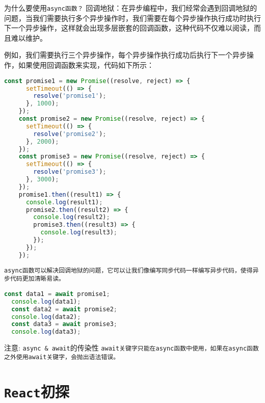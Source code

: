 \documentclass{beamer}
\begin{document}
\begin{frame}
  \framebreak

  \begin{block}{为什么要使用\tt{async}函数？}
    回调地狱：在异步编程中，我们经常会遇到回调地狱的问题，当我们需要执行多个异步操作时，我们需要在每个异步操作执行成功时执行下一个异步操作，这样就会出现多层嵌套的回调函数，这种代码不仅难以阅读，而且难以维护。

    例如，我们需要执行三个异步操作，每个异步操作执行成功后执行下一个异步操作，如果使用回调函数来实现，代码如下所示：
  \end{block}
  \begin{lstlisting}[language=JavaScript]
    const promise1 = new Promise((resolve, reject) => {
      setTimeout(() => {
        resolve('promise1');
      }, 1000);
    });
    const promise2 = new Promise((resolve, reject) => {
      setTimeout(() => {
        resolve('promise2');
      }, 2000);
    });
    const promise3 = new Promise((resolve, reject) => {
      setTimeout(() => {
        resolve('promise3');
      }, 3000);
    });
    promise1.then((result1) => {
      console.log(result1);
      promise2.then((result2) => {
        console.log(result2);
        promise3.then((result3) => {
          console.log(result3);
        });
      });
    });
\end{lstlisting}
  \begin{block}{}
    \tt{async}函数可以解决回调地狱的问题，它可以让我们像编写同步代码一样编写异步代码，使得异步代码更加清晰易读。

  \end{block}
  \begin{lstlisting}[language=JavaScript]
  const data1 = await promise1;
  console.log(data1);
  const data2 = await promise2;
  console.log(data2);
  const data3 = await promise3;
  console.log(data3);
\end{lstlisting}

  \framebreak

  \begin{alertblock}{注意: \texttt{async \& await}的传染性}
    \tt{await}关键字只能在\tt{async}函数中使用，如果在\tt{async}函数之外使用\tt{await}关键字，会抛出语法错误。

  \end{alertblock}


\end{frame}

\section{\texttt{React}初探}
\end{document}
